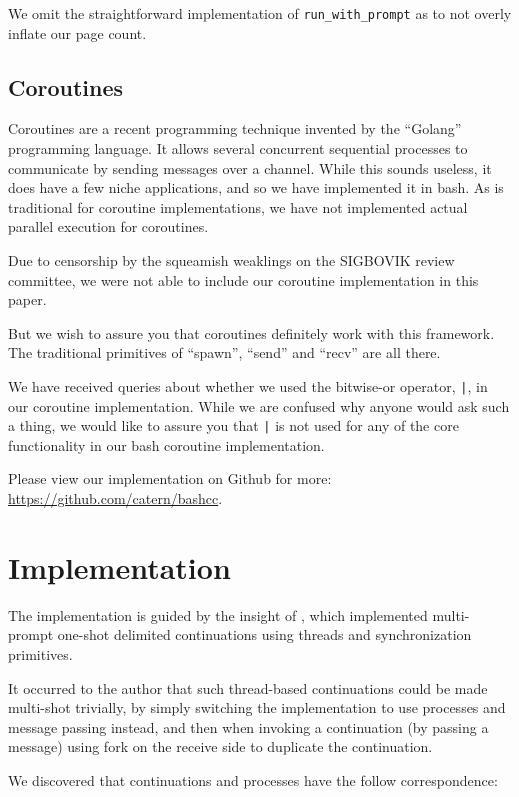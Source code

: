 \documentclass[sigplan]{acmart}
\begin{document}
We omit the straightforward implementation of \texttt{run\_with\_prompt} as to not overly inflate our page count.

\subsection{Coroutines}
Coroutines are a recent programming technique invented by the ``Golang'' programming language.
It allows several concurrent sequential processes to communicate by sending messages over a channel.
While this sounds useless, it does have a few niche applications, and so we have implemented it in bash.
As is traditional for coroutine implementations,
we have not implemented actual parallel execution for coroutines.

Due to censorship by the squeamish weaklings on the SIGBOVIK review committee,
we were not able to include our coroutine implementation in this paper.

But we wish to assure you that coroutines definitely work with this framework.
The traditional primitives of ``spawn'', ``send'' and ``recv'' are all there.

We have received queries about whether we used the bitwise-or operator,
\texttt{|},
in our coroutine implementation.
While we are confused why anyone would ask such a thing,
we would like to assure you that \texttt{|} is not used for any of the core functionality in our bash coroutine implementation.

Please view our implementation on Github for more:
\url{https://github.com/catern/bashcc}.

\section{Implementation}\label{implementation}
The implementation is guided by the insight of \cite{threads},
which implemented multi-prompt one-shot delimited continuations using threads and synchronization primitives.

It occurred to the author that such thread-based continuations could be made multi-shot trivially,
by simply switching the implementation to use processes and message passing instead,
and then when invoking a continuation (by passing a message) using fork on the receive side to duplicate the continuation.

We discovered that continuations and processes have the follow correspondence:
\end{document}
